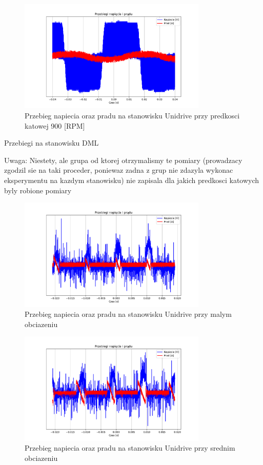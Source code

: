 \documentclass[11pt]{article}
\begin{document}
\begin{figure}[H]
\centering
\includegraphics[width=0.8\textwidth]{aun1_unidrive_rpm900.pdf}
\caption{Przebieg napiecia oraz pradu na stanowisku Unidrive przy predkosci katowej 900 [RPM]}
\end{figure}

Przebiegi na stanowisku DML

Uwaga: Niestety, ale grupa od ktorej otrzymalismy te pomiary (prowadzacy zgodzil sie na taki proceder, poniewaz zadna z grup nie zdazyla wykonac eksperymentu na kazdym stanowisku) nie zapisala dla jakich predkosci katowych
byly robione pomiary

\begin{figure}[H]
\centering
\includegraphics[width=0.8\textwidth]{aun1_dml_obciazenie_weak.pdf}
\caption{Przebieg napiecia oraz pradu na stanowisku Unidrive przy malym obciazeniu}
\end{figure}

\begin{figure}[H]
\centering
\includegraphics[width=0.8\textwidth]{aun1_dml_obciazenie_medium.pdf}
\caption{Przebieg napiecia oraz pradu na stanowisku Unidrive przy srednim obciazeniu}
\end{figure}
\end{document}
